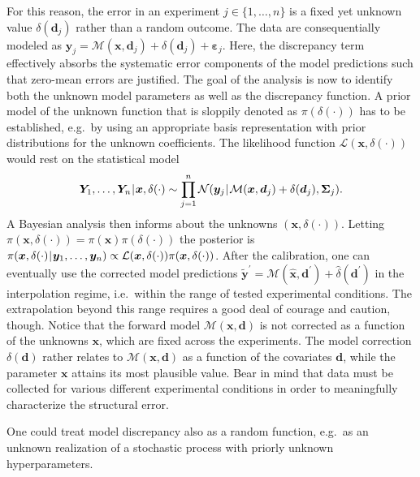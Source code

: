 For this reason, the error in an experiment \(j \in \{1,\ldots,n\}\) is a fixed yet unknown value \(\delta(\bm{d}_j)\) rather than a random outcome.
The data are consequentially modeled as \(\bm{y}_j = \mathcal{M}(\bm{x},\bm{d}_j) + \delta(\bm{d}_j) + \bm{\varepsilon}_j\).
Here, the discrepancy term effectively absorbs the systematic error components of the model predictions such that zero-mean errors are justified.
The goal of the analysis is now to identify both the unknown model parameters as well as the discrepancy function.
A prior model of the unknown function that is sloppily denoted as \(\pi(\delta(\cdot))\) has to be established,
e.g.\ by using an appropriate basis representation \cite{Bayesian:Farajpour2013,Bayesian:He2016:a} with prior distributions for the unknown coefficients.
The likelihood function \(\mathcal{L}(\bm{x},\delta(\cdot))\) would rest on the statistical model
\begin{equation} \label{eq:Inversion:Model:UnknownFunctionDiscrepancy}
  \bm{Y}_1,\ldots,\bm{Y}_n {\:\!}|{\:\!} \bm{x},\delta(\cdot) \sim \prod\limits_{j=1}^n \mathcal{N}(\bm{y}_j {\:\!}|{\:\!} \mathcal{M}(\bm{x},\bm{d}_j) + \delta(\bm{d}_j), \bm{\Sigma}_j).
\end{equation}
A Bayesian analysis then informs about the unknowns \((\bm{x},\delta(\cdot))\).
Letting \(\pi(\bm{x},\delta(\cdot)) = \pi(\bm{x}) \pi(\delta(\cdot))\) the posterior is
\(\pi(\bm{x},\delta(\cdot) {\:\!}|{\:\!} \bm{y}_1,\ldots,\bm{y}_n) \propto \mathcal{L}(\bm{x},\delta(\cdot)) \pi(\bm{x},\delta(\cdot))\).
After the calibration, one can eventually use the corrected model predictions \(\tilde{\bm{y}}^\prime = \mathcal{M}(\hat{\bm{x}},\bm{d}^\prime) + \hat{\delta}(\bm{d}^\prime)\)
in the interpolation regime, i.e.\ within the range of tested experimental conditions.
The extrapolation beyond this range requires a good deal of courage and caution, though.
Notice that the forward model \(\mathcal{M}(\bm{x},\bm{d})\) is not corrected as a function of the unknowns \(\bm{x}\), which are fixed across the experiments.
The model correction \(\delta(\bm{d})\) rather relates to \(\mathcal{M}(\bm{x},\bm{d})\) as a function of the covariates \(\bm{d}\), while the parameter \(\bm{x}\) attains its most plausible value.
Bear in mind that data must be collected for various different experimental conditions in order to meaningfully characterize the structural error.
\par %
One could treat model discrepancy also as a random function, e.g.\ as an unknown realization of a stochastic process with priorly unknown hyperparameters.
